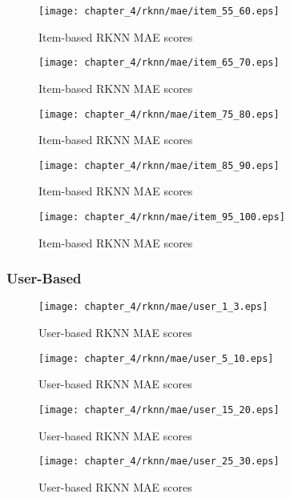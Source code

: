 \begin{figure}[H]
\centering
\texttt{[image: chapter\_4/rknn/mae/item\_55\_60.eps]}
\caption{Item-based RKNN MAE scores}
\end{figure}

\begin{figure}[H]
\centering
\texttt{[image: chapter\_4/rknn/mae/item\_65\_70.eps]}
\caption{Item-based RKNN MAE scores}
\end{figure}

\begin{figure}[H]
\centering
\texttt{[image: chapter\_4/rknn/mae/item\_75\_80.eps]}
\caption{Item-based RKNN MAE scores}
\end{figure}

\begin{figure}[H]
\centering
\texttt{[image: chapter\_4/rknn/mae/item\_85\_90.eps]}
\caption{Item-based RKNN MAE scores}
\end{figure}

\begin{figure}[H]
\centering
\texttt{[image: chapter\_4/rknn/mae/item\_95\_100.eps]}
\caption{Item-based RKNN MAE scores}
\end{figure}

\subsubsection{User-Based}

\begin{figure}[H]
\centering
\texttt{[image: chapter\_4/rknn/mae/user\_1\_3.eps]}
\caption{User-based RKNN MAE scores}
\end{figure}

\begin{figure}[H]
\centering
\texttt{[image: chapter\_4/rknn/mae/user\_5\_10.eps]}
\caption{User-based RKNN MAE scores}
\end{figure}

\begin{figure}[H]
\centering
\texttt{[image: chapter\_4/rknn/mae/user\_15\_20.eps]}
\caption{User-based RKNN MAE scores}
\end{figure}

\begin{figure}[H]
\centering
\texttt{[image: chapter\_4/rknn/mae/user\_25\_30.eps]}
\caption{User-based RKNN MAE scores}
\end{figure}


